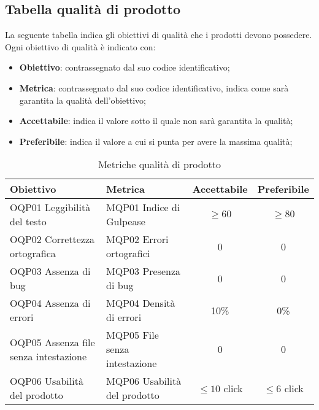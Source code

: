 \documentclass[../piano_di_qualifica.tex]{subfiles}
\begin{document}
\subsection{Tabella qualità di prodotto}
La seguente tabella indica gli obiettivi di qualità che i prodotti devono possedere.\\
Ogni obiettivo di qualità è indicato con:
\smallbreak
\begin{itemize}
	\item \textbf{Obiettivo}: contrassegnato dal suo codice identificativo;
	\item \textbf{Metrica}: contrassegnato dal suo codice identificativo, indica come sarà garantita la qualità dell'obiettivo;
	\item \textbf{Accettabile}: indica il valore sotto il quale non sarà garantita la qualità;
	\item \textbf{Preferibile}: indica il valore a cui si punta per avere la massima qualità;
\end{itemize}

\begin{table}[!ht]
	\centering
	\begin{tabular}{|l|l|c|c|}
		\hline
		\rowcolor{lightgray}
		\textbf{Obiettivo}                    & \textbf{Metrica}              & \textbf{Accettabile} & \textbf{Preferibile} \\
		\hline
		OQP01 Leggibilità del testo           & MQP01 Indice di Gulpease      & \(\ge 60\)           & \(\ge 80\)           \\
		\hline
		OQP02 Correttezza ortografica         & MQP02 Errori ortografici      & 0                    & 0                    \\
		\hline
		OQP03 Assenza di bug                  & MQP03 Presenza di bug         & 0                    & 0                    \\
		\hline
		OQP04 Assenza di errori               & MQP04 Densità di errori       & 10\%                 & 0\%                  \\
		\hline
		OQP05 Assenza file senza intestazione & MQP05 File senza intestazione & 0                    & 0                    \\
		\hline
		OQP06 Usabilità del prodotto          & MQP06 Usabilità del prodotto  & \(\leq10\) click     & \(\leq6\) click      \\
		\hline
	\end{tabular}
	\caption{Metriche qualità di prodotto}
\end{table}
\end{document}
